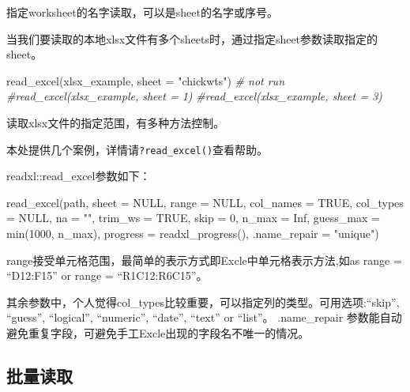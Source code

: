\documentclass[
]{book}
\newenvironment{Shaded}{\begin{snugshade}}{\end{snugshade}}
\newcommand{\AttributeTok}[1]{\textcolor[rgb]{0.77,0.63,0.00}{#1}}
\newcommand{\CommentTok}[1]{\textcolor[rgb]{0.56,0.35,0.01}{\textit{#1}}}
\newcommand{\ConstantTok}[1]{\textcolor[rgb]{0.00,0.00,0.00}{#1}}
\newcommand{\DecValTok}[1]{\textcolor[rgb]{0.00,0.00,0.81}{#1}}
\newcommand{\FunctionTok}[1]{\textcolor[rgb]{0.00,0.00,0.00}{#1}}
\newcommand{\NormalTok}[1]{#1}
\newcommand{\StringTok}[1]{\textcolor[rgb]{0.31,0.60,0.02}{#1}}
\begin{document}
指定worksheet的名字读取，可以是sheet的名字或序号。

当我们要读取的本地xlsx文件有多个sheets时，通过指定sheet参数读取指定的sheet。

\begin{Shaded}
\begin{Highlighting}[]
\FunctionTok{read\_excel}\NormalTok{(xlsx\_example, }\AttributeTok{sheet =} \StringTok{"chickwts"}\NormalTok{)}
\CommentTok{\# not run}
\CommentTok{\#read\_excel(xlsx\_example, sheet = 1)}
\CommentTok{\#read\_excel(xlsx\_example, sheet = 3)}
\end{Highlighting}
\end{Shaded}

读取xlsx文件的指定范围，有多种方法控制。

本处提供几个案例，详情请\texttt{?read\_excel()}查看帮助。

readxl::read\_excel参数如下：

\begin{Shaded}
\begin{Highlighting}[]
\FunctionTok{read\_excel}\NormalTok{(path, }\AttributeTok{sheet =} \ConstantTok{NULL}\NormalTok{, }\AttributeTok{range =} \ConstantTok{NULL}\NormalTok{, }\AttributeTok{col\_names =} \ConstantTok{TRUE}\NormalTok{,}
  \AttributeTok{col\_types =} \ConstantTok{NULL}\NormalTok{, }\AttributeTok{na =} \StringTok{""}\NormalTok{, }\AttributeTok{trim\_ws =} \ConstantTok{TRUE}\NormalTok{, }\AttributeTok{skip =} \DecValTok{0}\NormalTok{,}
  \AttributeTok{n\_max =} \ConstantTok{Inf}\NormalTok{, }\AttributeTok{guess\_max =} \FunctionTok{min}\NormalTok{(}\DecValTok{1000}\NormalTok{, n\_max),}
  \AttributeTok{progress =} \FunctionTok{readxl\_progress}\NormalTok{(), }\AttributeTok{.name\_repair =} \StringTok{"unique"}\NormalTok{)}
\end{Highlighting}
\end{Shaded}

range接受单元格范围，最简单的表示方式即Excle中单元格表示方法,如as range = ``D12:F15'' or range = ``R1C12:R6C15''。

其余参数中，个人觉得col\_types比较重要，可以指定列的类型。可用选项:``skip'', ``guess'', ``logical'', ``numeric'', ``date'', ``text'' or ``list''。
.name\_repair 参数能自动避免重复字段，可避免手工Excle出现的字段名不唯一的情况。

\hypertarget{ux6279ux91cfux8bfbux53d6}{%
\subsection{批量读取}\label{ux6279ux91cfux8bfbux53d6}}
\end{document}
